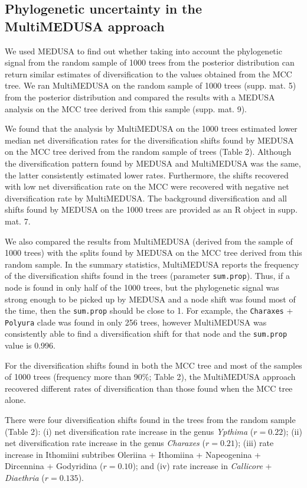 \documentclass[10pt]{article}
\begin{document}
\subsection*{Phylogenetic uncertainty in the MultiMEDUSA
approach}

We used MEDUSA to find out whether taking into account the phylogenetic
signal from the random sample of 1000 trees from the posterior
distribution can return similar estimates of diversification to the
values obtained from the MCC tree. We ran MultiMEDUSA on the random
sample of 1000 trees (supp. mat. 5) from the posterior distribution and
compared the results with a MEDUSA analysis on the MCC tree derived from
this sample (supp. mat. 9).

We found that the analysis by MultiMEDUSA on the 1000 trees estimated
lower median net diversification rates for the diversification shifts
found by MEDUSA on the MCC tree derived from the random sample of trees
(Table 2). Although the diversification pattern found by MEDUSA and
MultiMEDUSA was the same, the latter consistently estimated lower rates.
Furthermore, the shifts recovered with low net diversification rate on
the MCC were recovered with negative net diversification rate by
MultiMEDUSA. The background diversification and all shifts found by
MEDUSA on the 1000 trees are provided as an R object in supp. mat. 7.

We also compared the results from MultiMEDUSA (derived from the sample
of 1000 trees) with the splits found by MEDUSA on the MCC tree derived
from this random sample. In the summary statistics, MultiMEDUSA reports
the frequency of the diversification shifts found in the trees
(parameter \texttt{sum.prop}). Thus, if a node is found in only half of
the 1000 trees, but the phylogenetic signal was strong enough to be
picked up by MEDUSA and a node shift was found most of the time, then
the \texttt{sum.prop} should be close to 1. For example, the
\texttt{Charaxes} + \texttt{Polyura} clade was found in only 256 trees,
however MultiMEDUSA was consistently able to find a diversification
shift for that node and the \texttt{sum.prop} value is 0.996.

For the diversification shifts found in both the MCC tree and most of
the samples of 1000 trees (frequency more than 90\%; Table 2), the
MultiMEDUSA approach recovered different rates of diversification than
those found when the MCC tree alone.

There were four diversification shifts found in the trees from the
random sample (Table 2): (i) net diversification rate increase in the
genus \emph{Ypthima} (\(r = 0.22\)); (ii) net diversification rate
increase in the genus \emph{Charaxes} (\(r = 0.21\)); (iii) rate
increase in Ithomiini subtribes Oleriina + Ithomiina + Napeogenina +
Dircennina + Godyridina (\(r = 0.10\)); and (iv) rate increase in
\emph{Callicore} + \emph{Diaethria} (\(r = 0.135\)).
\end{document}
